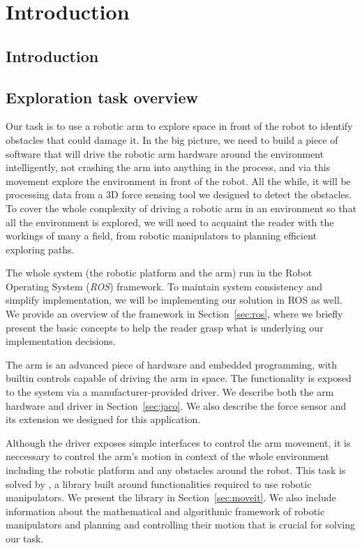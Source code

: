 \documentclass[buriama8_dp.tex]{subfiles}
\begin{document}
\chapter{Introduction}

\section{Introduction}


\section{Exploration task overview}
\label{sec:label}

Our task is to use a robotic arm to explore space in front of the robot to identify obstacles that could damage it. In the big picture, we need to build a piece of software that will drive the robotic arm hardware around the environment intelligently, not crashing the arm into anything in the process, and via this movement explore the environment in front of the robot. All the while, it will be processing data from a 3D force sensing tool we designed to detect the obstacles. To cover the whole complexity of driving a robotic arm in an environment so that all the environment is explored, we will need to acquaint the reader with the workings of many a field, from robotic manipulators to planning efficient exploring paths.

The whole system (the robotic platform and the arm) run in the Robot Operating System (\emph{ROS}) framework. To maintain system consistency and simplify implementation, we will be implementing our solution in ROS as well. We provide an overview of the framework in Section~\ref{sec:ros}, where we briefly present the basic concepts to help the reader grasp what is underlying our implementation decisions.

The arm is an advanced piece of hardware and embedded programming, with builtin controls capable of driving the arm in space. The functionality is exposed to the system via a manufacturer-provided driver. We describe both the arm hardware and driver in Section~\ref{sec:jaco}. We also describe the force sensor and its extension we designed for this application. 

Although the driver exposes simple interfaces to control the arm movement, it is neccessary to control the arm's motion in context of the whole environment including the robotic platform and any obstacles around the robot. This task is solved by , a library built around functionalities required to use robotic manipulators. We present the library in Section~\ref{sec:moveit}. We also include information about the mathematical and algorithmic framework of robotic manipulators and planning and controlling their motion that is crucial for solving our task.
\end{document}
